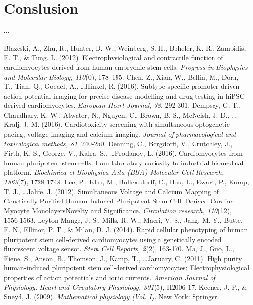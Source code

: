 \documentclass[12pt,a4paper]{article}
\begin{document}
\section{Conslusion} \label{Conclusion}
%
$\cdots$
%
\begin{thebibliography}{99}
 Blazeski, A., Zhu, R., Hunter, D. W., Weinberg, S. H., Boheler, K. R., Zambidis, E. T., \& Tung, L. (2012). Electrophysiological and contractile function of cardiomyocytes derived from human embryonic stem cells. \textit{Progress in Biophysics and Molecular Biology, 110}(0), 178–195.
 Chen, Z., Xian, W., Bellin, M., Dorn, T., Tian, Q., Goedel, A., \ldots Hinkel, R. (2016). Subtype-specific promoter-driven action potential imaging for precise disease modelling and drug testing in hiPSC-derived cardiomyocytes. \textit{European Heart Journal, 38}, 292-301.
 Dempsey, G. T., Chaudhary, K. W., Atwater, N., Nguyen, C., Brown, B. S., McNeish, J. D., \ldots Kralj, J. M. (2016). Cardiotoxicity screening with simultaneous optogenetic pacing, voltage imaging and calcium imaging. \textit{Journal of pharmacological and toxicological methods, 81}, 240-250.
 Denning, C., Borgdorff, V., Crutchley, J., Firth, K. S., George, V., Kalra, S., \ldots Prodanov, L. (2016). Cardiomyocytes from human pluripotent stem cells: from laboratory curiosity to industrial biomedical platform. \textit{Biochimica et Biophysica Acta (BBA)-Molecular Cell Research, 1863}(7), 1728-1748.
 Lee, P., Klos, M., Bollensdorff, C., Hou, L., Ewart, P., Kamp, T. J., \ldots Jalife, J. (2012). Simultaneous Voltage and Calcium Mapping of Genetically Purified Human Induced Pluripotent Stem Cell–Derived Cardiac Myocyte MonolayersNovelty and Significance. \textit{Circulation research, 110}(12), 1556-1563.
 Leyton-Mange, J. S., Mills, R. W., Macri, V. S., Jang, M. Y., Butte, F. N., Ellinor, P. T., \& Milan, D. J. (2014). Rapid cellular phenotyping of human pluripotent stem cell-derived cardiomyocytes using a genetically encoded fluorescent voltage sensor. \textit{Stem Cell Reports, 2}(2), 163-170.
 Ma, J., Guo, L., Fiene, S., Anson, B., Thomson, J., Kamp, T., \ldots January, C. (2011). High purity human-induced pluripotent stem cell-derived cardiomyocytes: Electrophysiological properties of action potentials and ionic currents. \textit{American Journal of Physiology. Heart and Circulatory Physiology, 301}(5), H2006-17.
 Keener, J. P., \& Sneyd, J. (2009). \textit{Mathematical physiology (Vol. I)}. New York: Springer.

\end{thebibliography}
\end{document}
